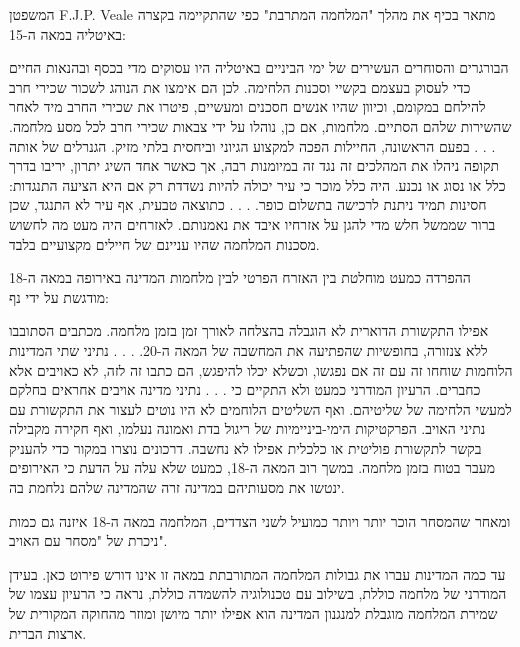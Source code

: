 \documentclass[10pt,oneside]{book}
\begin{document}
המשפטן F.J.P. Veale מתאר בכיף את מהלך "המלחמה המתרבת" כפי שהתקיימה בקצרה באיטליה במאה ה-15:

\begin{quoting}
הבורגרים והסוחרים העשירים של ימי הביניים באיטליה היו עסוקים מדי בכסף ובהנאות החיים כדי לעסוק בעצמם בקשיי וסכנות הלחימה. לכן הם אימצו את הנוהג לשכור שכירי חרב להילחם במקומם, וכיוון שהיו אנשים חסכנים ומעשיים, פיטרו את שכירי החרב מיד לאחר שהשירות שלהם הסתיים. מלחמות, אם כן, נוהלו על ידי צבאות שכירי חרב לכל מסע מלחמה. . . . בפעם הראשונה, החיילות הפכה למקצוע הגיוני וביחסית בלתי מזיק. הגנרלים של אותה תקופה ניהלו את המהלכים זה נגד זה במיומנות רבה, אך כאשר אחד השיג יתרון, יריבו בדרך כלל או נסוג או נכנע. היה כלל מוכר כי עיר יכולה להיות נשדדת רק אם היא הציעה התנגדות: חסינות תמיד ניתנת לרכישה בתשלום כופר. . . . כתוצאה טבעית, אף עיר לא התנגד, שכן ברור שממשל חלש מדי להגן על אזרחיו איבד את נאמנותם. לאזרחים היה מעט מה לחשוש מסכנות המלחמה שהיו עניינם של חיילים מקצועיים בלבד.
\end{quoting}

ההפרדה כמעט מוחלטת בין האזרח הפרטי לבין מלחמות המדינה באירופה במאה ה-18 מודגשת על ידי נף:

\begin{quoting}
אפילו התקשורת הדוארית לא הוגבלה בהצלחה לאורך זמן בזמן מלחמה. מכתבים הסתובבו ללא צנזורה, בחופשיות שהפתיעה את המחשבה של המאה ה-20. . . . נתיני שתי המדינות הלוחמות שוחחו זה עם זה אם נפגשו, וכשלא יכלו להיפגש, הם כתבו זה לזה, לא כאויבים אלא כחברים. הרעיון המודרני כמעט ולא התקיים כי . . . נתיני מדינה אויבים אחראים בחלקם למעשי הלחימה של שליטיהם. ואף השליטים הלוחמים לא היו נוטים לעצור את התקשורת עם נתיני האויב. הפרקטיקות הימי-ביניימיות של ריגול בדת ואמונה נעלמו, ואף חקירה מקבילה בקשר לתקשורת פוליטית או כלכלית אפילו לא נחשבה. דרכונים נוצרו במקור כדי להעניק מעבר בטוח בזמן מלחמה. במשך רוב המאה ה-18, כמעט שלא עלה על הדעת כי האירופים ינטשו את מסעותיהם במדינה זרה שהמדינה שלהם נלחמת בה.
\end{quoting}

ומאחר שהמסחר הוכר יותר ויותר כמועיל לשני הצדדים, המלחמה במאה ה-18 איזנה גם כמות ניכרת של "מסחר עם האויב".

עד כמה המדינות עברו את גבולות המלחמה המתורבתת במאה זו אינו דורש פירוט כאן. בעידן המודרני של מלחמה כוללת, בשילוב עם טכנולוגיה להשמדה כוללת, נראה כי הרעיון עצמו של שמירת המלחמה מוגבלת למנגנון המדינה הוא אפילו יותר מיושן ומוזר מהחוקה המקורית של ארצות הברית.
\end{document}
